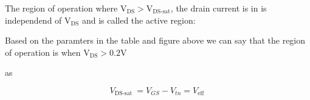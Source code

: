 The region of operation where $\text{V}_\text{DS}>\text{V}_\text{DS-sat}$, the drain current is in is independend of $\text{V}_\text{DS}$ and is called the active region: 


Based on the paramters in the table and figure above we can say that the region of operation is when $\text{V}_\text{DS}>0.2\text{V}$ 

as  

\begin{equation*}
    V_{\text {DS-sat }}=V_{G S}-V_{t n}=V_{\text {eff }} 
\end{equation*}
